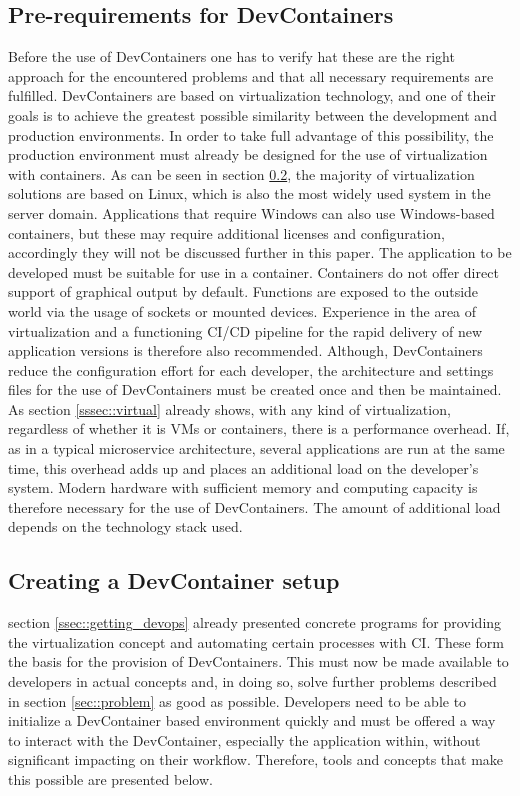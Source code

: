     \subsection{Pre-requirements for DevContainers}
    Before the use of DevContainers one has to verify hat these are the right approach for the encountered problems and that all necessary requirements are fulfilled.\newline
    DevContainers are based on virtualization technology, and one of their goals is to achieve the greatest possible similarity between the development and production environments. In order to take full advantage of this possibility, the production environment must already be designed for the use of virtualization with containers. As can be seen in section \ref{ssec::toolsused}, the majority of virtualization solutions are based on Linux, which is also the most widely used system in the server domain. Applications that require Windows can also use Windows-based containers, but these may require additional licenses and configuration, accordingly they will not be discussed further in this paper. The application to be developed must be suitable for use in a container. Containers do not offer direct support of graphical output by default. Functions are exposed to the outside world via the usage of sockets or mounted devices. Experience in the area of virtualization and a functioning \ac{CI}/\ac{CD} pipeline for the rapid delivery of new application versions is therefore also recommended.\newline
    Although, DevContainers reduce the configuration effort for each developer, the architecture and settings files for the use of DevContainers must be created once and then be maintained. As section \ref{sssec::virtual} already shows, with any kind of virtualization, regardless of whether it is VMs or containers, there is a performance overhead. If, as in a typical microservice architecture, several applications are run at the same time, this overhead adds up and places an additional load on the developer's system. Modern hardware with sufficient memory and computing capacity is therefore necessary for the use of DevContainers. The amount of additional load depends on the technology stack used.

    \subsection{Creating a DevContainer setup}\label{ssec::toolsused}
    section \ref{ssec::getting_devops} already presented concrete programs for providing the virtualization concept and automating certain processes with \ac{CI}. These form the basis for the provision of DevContainers. This must now be made available to developers in actual concepts and, in doing so, solve further problems described in section \ref{sec::problem} as good as possible. Developers need to be able to initialize a DevContainer based environment quickly and must be offered a way to interact with the DevContainer, especially the application within, without significant impacting on their workflow. Therefore, tools and concepts that make this possible are presented below.


